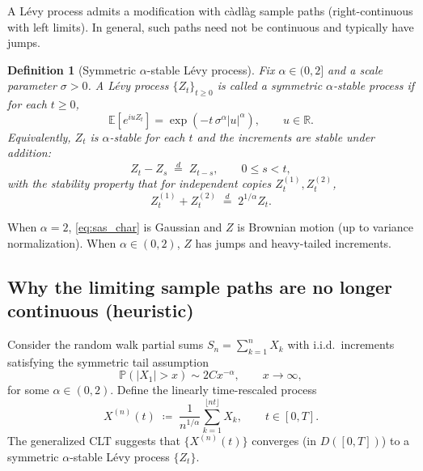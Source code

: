 \documentclass[11pt]{article}
\newtheorem{definition}{Definition}
\begin{document}
A L\'evy process admits a modification with c\`adl\`ag sample paths (right-continuous with left limits). In general, such paths need not be continuous and typically have jumps.

\begin{definition}[Symmetric $\alpha$-stable L\'evy process]\label{def:saslp}
Fix $\alpha\in(0,2]$ and a scale parameter $\sigma>0$. A L\'evy process $\{Z_t\}_{t\ge 0}$ is called a \emph{symmetric $\alpha$-stable process} if for each $t\ge 0$,
\begin{equation}\label{eq:sas_char}
{\mathbb E}\!\left[e^{iuZ_t}\right]
= \exp\!\left(-t\,\sigma^\alpha |u|^\alpha\right),
\qquad u\in\mathbb R.
\end{equation}
Equivalently, $Z_t$ is $\alpha$-stable for each $t$ and the increments are stable under addition:
\begin{equation}\label{eq:stable_increments}
Z_t-Z_s \;\stackrel{d}{=}\; Z_{t-s},
\qquad 0\le s<t,
\end{equation}
with the stability property that for independent copies $Z^{(1)}_{t},Z^{(2)}_{t}$,
\begin{equation}\label{eq:stability_addition}
Z^{(1)}_{t}+Z^{(2)}_{t} \;\stackrel{d}{=}\; 2^{1/\alpha} Z_{t}.
\end{equation}
\end{definition}

When $\alpha=2$, \eqref{eq:sas_char} is Gaussian and $Z$ is Brownian motion (up to variance normalization). When $\alpha\in(0,2)$, $Z$ has jumps and heavy-tailed increments.

\subsection{Why the limiting sample paths are no longer continuous (heuristic)}\label{subsec:paths_not_continuous}

Consider the random walk partial sums $S_n=\sum_{k=1}^n X_k$ with i.i.d.\ increments satisfying the symmetric tail assumption
\begin{equation}\label{eq:symm_tail_again}
{\mathbb P}(|X_1|>x)\sim 2C x^{-\alpha},
\qquad x\to\infty,
\end{equation}
for some $\alpha\in(0,2)$. Define the linearly time-rescaled process
\begin{equation}\label{eq:scaled_rw_process}
X^{(n)}(t)\;\coloneqq\;\frac{1}{n^{1/\alpha}}\sum_{k=1}^{\lfloor nt\rfloor} X_k,
\qquad t\in[0,T].
\end{equation}
The generalized CLT suggests that $\{X^{(n)}(t)\}$ converges (in $D([0,T])$) to a symmetric $\alpha$-stable L\'evy process $\{Z_t\}$.
\end{document}

